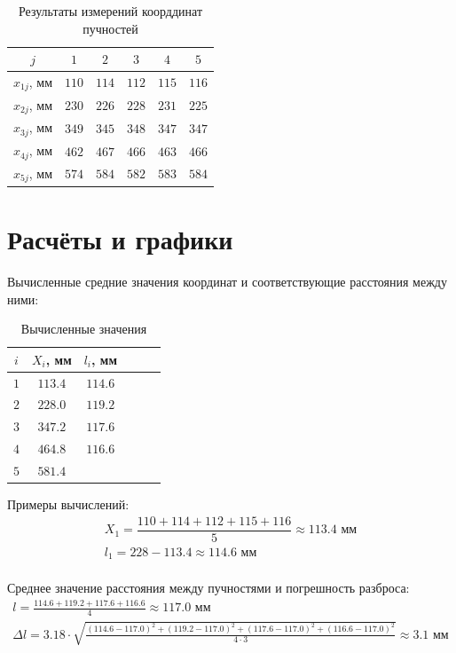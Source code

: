 \documentclass{article}
\begin{document}
\begin{table}[H]
   \centering
   \begin{tabular}{|c|c|c|c|c|c|} \hline
$j$ & $1$ & $2$ & $3$ & $4$ & $5$\\\hline
$x_{1j}$, мм & $110$ & $114$ & $112$ & $115$ & $116$\\\hline
$x_{2j}$, мм & $230$ & $226$ & $228$ & $231$ & $225$\\\hline
$x_{3j}$, мм & $349$ & $345$ & $348$ & $347$ & $347$\\\hline
$x_{4j}$, мм & $462$ & $467$ & $466$ & $463$ & $466$\\\hline
$x_{5j}$, мм & $574$ & $584$ & $582$ & $583$ & $584$\\\hline
   \end{tabular}
   \caption{Результаты измерений коорддинат пучностей}
\end{table}

\section{Расчёты и графики}

Вычисленные средние значения координат и соответствующие расстояния между ними:
\begin{table}[H]
   \centering
   \begin{tabular}{|c|c|c|c|c|c|} \hline
$i$ & $X_{i}$, мм & $l_{i}$, мм \\\hline
$1$ & $113.4$ & $114.6$\\\hline
$2$ & $228.0$ & $119.2$\\\hline
$3$ & $347.2$ & $117.6$\\\hline
$4$ & $464.8$ & $116.6$\\\hline
$5$ & $581.4$ & \\\hline
   \end{tabular}
   \caption{Вычисленные значения}
\end{table}

Примеры вычислений:
\begin{gather*}
X_1 = \dfrac{110 + 114 + 112 + 115 + 116}{5}\approx113.4\text{ мм}\\
l_1 = 228 - 113.4 \approx114.6\text{ мм}\\
\end{gather*}

Среднее значение расстояния между пучностями и погрешность разброса:
\begin{gather*}
    l = \frac{ 114.6+119.2+117.6+116.6}{ 4}\approx117.0\text{ мм}\\
    \Delta l = 3.18 \cdot \sqrt{\frac{ (114.6-117.0)^2+(119.2-117.0)^2+(117.6-117.0)^2+(116.6-117.0)^2}{ 4\cdot3} }\approx3.1 \text{ мм}
\end{gather*}
\end{document}

